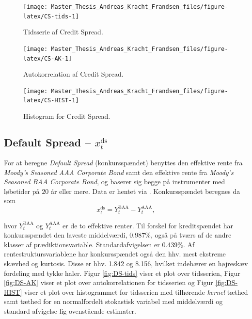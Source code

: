\documentclass[
  a4paper,
  oneside]{memoir}
\begin{document}
\begin{figure}[H]

{\centering \texttt{[image: Master\_Thesis\_Andreas\_Kracht\_Frandsen\_files/figure-latex/CS-tids-1]} 

}

\caption{Tidsserie af Credit Spread.}\label{fig:CS-tids}
\end{figure}

\begin{figure}[H]

{\centering \texttt{[image: Master\_Thesis\_Andreas\_Kracht\_Frandsen\_files/figure-latex/CS-AK-1]} 

}

\caption{Autokorrelation af Credit Spread.}\label{fig:CS-AK}
\end{figure}

\begin{figure}[H]

{\centering \texttt{[image: Master\_Thesis\_Andreas\_Kracht\_Frandsen\_files/figure-latex/CS-HIST-1]} 

}

\caption{Histogram for Credit Spread.}\label{fig:CS-HIST}
\end{figure}

\hypertarget{default-spread-x_ttextds}{%
\subsection{\texorpdfstring{Default Spread -- \(x_t^{\text{ds}}\)}{Default Spread -- x\_t\^{}\{\textbackslash text\{ds\}\}}}\label{default-spread-x_ttextds}}

For at beregne \emph{Default Spread} (konkursspændet) benyttes den effektive rente fra \emph{Moody's Seasoned AAA Corporate Bond} samt den effektive rente fra \emph{Moody's Seasoned BAA Corporate Bond}, og baserer sig begge på instrumenter med løbetider på \(20\) år eller mere. Data er hentet via \citep{Goyal2007}. Konkursspændet beregnes da som
\[x_t^{\text{ds}}=Y_t^{\text{BAA}}-Y_t^{\text{AAA}},\]

hvor \(Y_t^{\text{BAA}}\) og \(Y_t^{\text{AAA}}\) er de to effektive renter. Til forskel for kreditspændet har konkursspændet den laveste middelværdi, 0.987\(\%\), også på tværs af de andre klasser af prædiktionsvariable. Standardafvigelsen er 0.439\(\%\). Af rentestruktursvariablene har konkursspændet også den hhv. mest ekstreme skævhed og kurtosis. Disse er hhv. 1.842 og 8.156, hvilket indebærer en højreskæv fordeling med tykke haler. Figur \ref{fig:DS-tids} viser et plot over tidsserien, Figur \ref{fig:DS-AK} viser et plot over autokorrelationen for tidsserien og Figur \ref{fig:DS-HIST} viser et plot over histogrammet for tidsserien med tilhørende \emph{kernel} tæthed samt tæthed for en normalfordelt stokastisk variabel med middelværdi og standard afvigelse lig ovenstående estimater.
\end{document}
